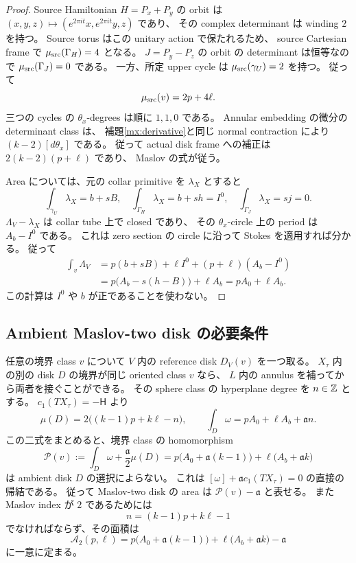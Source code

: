 \begin{proof}
Source Hamiltonian $H=P_x+P_y$ の orbit は
$(x,y,z)\mapsto(e^{2\pi it}x,e^{2\pi it}y,z)$ であり、
その complex determinant は winding $2$ を持つ。
Source torus はこの unitary action で保たれるため、
source Cartesian frame で $\mu_{\rm src}(\Gamma_H)=4$ となる。
$J=P_y-P_z$ の orbit の determinant は恒等なので
$\mu_{\rm src}(\Gamma_J)=0$ である。
一方、所定 upper cycle は $\mu_{\rm src}(\gamma_U)=2$ を持つ。
従って
\[
 \mu_{\rm src}(v)=2p+4\ell.
\]
三つの cycles の $\theta_x$-degrees は順に $1,1,0$ である。
Annular embedding の微分の determinant class は、
補題\ref{mx:derivative}と同じ normal contraction により
$(k-2)[d\theta_x]$ である。
従って actual disk frame への補正は $2(k-2)(p+\ell)$ であり、
Maslov の式が従う。

Area については、元の collar primitive を $\lambda_X$ とすると
\[
 \int_{\gamma_U}\lambda_X=b+sB,
 \quad
 \int_{\Gamma_H}\lambda_X=b+sh=I^0,
 \quad
 \int_{\Gamma_J}\lambda_X=sj=0.
\]
$\Lambda_V-\lambda_X$ は collar tube 上で closed であり、
その $\theta_x$-circle 上の period は $A_b-I^0$ である。
これは zero section の circle に沿って Stokes を適用すれば分かる。
従って
\[
 \begin{split}
 \int_v\Lambda_V
 &=p(b+sB)+\ell I^0+(p+\ell)(A_b-I^0)\\
 &=p\bigl(A_b-s(h-B)\bigr)+\ell A_b
 =pA_0+\ell A_b.
 \end{split}
\]
この計算は $I^0$ や $b$ が正であることを使わない。
\end{proof}

\subsection{Ambient Maslov-two disk の必要条件}

任意の境界 class $v$ について $V$ 内の reference disk $D_V(v)$ を一つ取る。
$X_\tau$ 内の別の disk $D$ の境界が同じ oriented class $v$ なら、
$L$ 内の annulus を補ってから両者を接ぐことができる。
その sphere class の hyperplane degree を $n\in\mathbb Z$ とする。
$c_1(TX_\tau)=-\mathsf H$ より
\begin{equation}\label{ml:ambient-comparison}
 \mu(D)=2\bigl((k-1)p+k\ell-n\bigr),\qquad
 \int_D\omega=pA_0+\ell A_b+\mathfrak a n.
\end{equation}
この二式をまとめると、境界 class の homomorphism
\begin{equation}\label{ml:combined-period}
 \mathcal P(v):=\int_D\omega+\frac{\mathfrak a}{2}\mu(D)
 =p\bigl(A_0+\mathfrak a(k-1)\bigr)
  +\ell\bigl(A_b+\mathfrak a k\bigr)
\end{equation}
は ambient disk $D$ の選択によらない。
これは $[\omega]+\mathfrak a c_1(TX_\tau)=0$ の直接の帰結である。
従って Maslov-two disk の area は $\mathcal P(v)-\mathfrak a$ と表せる。
また Maslov index が $2$ であるためには
\begin{equation}\label{ml:forced-degree}
 n=(k-1)p+k\ell-1
\end{equation}
でなければならず、その面積は
\begin{equation}\label{ml:ambient-area}
 \mathcal A_2(p,\ell)
 =p\bigl(A_0+\mathfrak a(k-1)\bigr)
  +\ell\bigl(A_b+\mathfrak a k\bigr)-\mathfrak a
\end{equation}
に一意に定まる。

